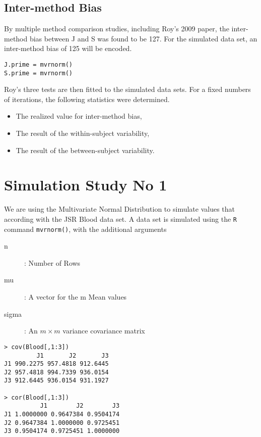 \documentclass[a4paper,12pt]{article}
\begin{document}
\subsection{Inter-method Bias}

By multiple method comparison studies, including Roy's 2009 paper, the inter-method bias between J and S was found to be 127.
For the simulated data set, an inter-method bias of 125 will be encoded.


\begin{framed}
\begin{verbatim}
J.prime = mvrnorm()
S.prime = mvrnorm()
\end{verbatim}
\end{framed}

Roy's three tests are then fitted to the simulated data sets. For a fixed numbers of iterations, the following statistics were determined.
\begin{itemize}
\item The realized value for inter-method bias,
\item The result of the within-subject variability,
\item The result of the between-subject variability.
\end{itemize}

\section{Simulation Study No 1}



We are using the Multivariate Normal Distribution to simulate values that according with the JSR Blood data set.
A data set is simulated using the \texttt{R} command \texttt{mvrnorm()}, with the additional arguments

\begin{description}
\item[n] : Number of Rows
\item[mu] : A vector for the m Mean values
\item[sigma] : An $m \times m$ variance covariance matrix
\end{description}

\begin{framed}
\begin{verbatim}
> cov(Blood[,1:3])
         J1       J2       J3
J1 990.2275 957.4818 912.6445
J2 957.4818 994.7339 936.0154
J3 912.6445 936.0154 931.1927

> cor(Blood[,1:3])
          J1        J2        J3
J1 1.0000000 0.9647384 0.9504174
J2 0.9647384 1.0000000 0.9725451
J3 0.9504174 0.9725451 1.0000000
\end{verbatim}
\end{framed}
\end{document}
